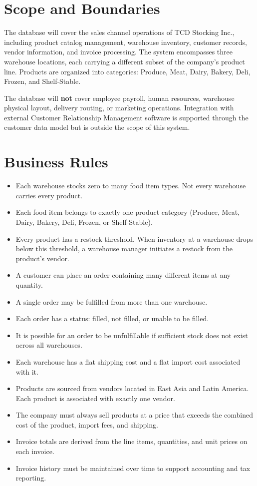 \section{Scope and Boundaries}

The database will cover the sales channel operations of TCD Stocking Inc., including product
catalog management, warehouse inventory, customer records, vendor information, and invoice
processing. The system encompasses three warehouse locations, each carrying a different subset of
the company's product line. Products are organized into categories: Produce, Meat, Dairy, Bakery,
Deli, Frozen, and Shelf-Stable.

The database will \textbf{not} cover employee payroll, human resources, warehouse physical
layout, delivery routing, or marketing operations. Integration with external Customer Relationship
Management software is supported through the customer data model but is outside the scope of
this system.

\section{Business Rules}

\begin{itemize}
  \item Each warehouse stocks zero to many food item types. Not every warehouse carries every product.
  \item Each food item belongs to exactly one product category (Produce, Meat, Dairy, Bakery, Deli,
    Frozen, or Shelf-Stable).
  \item Every product has a restock threshold. When inventory at a warehouse drops below this
    threshold, a warehouse manager initiates a restock from the product's vendor.
  \item A customer can place an order containing many different items at any quantity.
  \item A single order may be fulfilled from more than one warehouse.
  \item Each order has a status: filled, not filled, or unable to be filled.
  \item It is possible for an order to be unfulfillable if sufficient stock does not exist across
    all warehouses.
  \item Each warehouse has a flat shipping cost and a flat import cost associated with it.
  \item Products are sourced from vendors located in East Asia and Latin America. Each product is
    associated with exactly one vendor.
  \item The company must always sell products at a price that exceeds the combined cost of the
    product, import fees, and shipping.
  \item Invoice totals are derived from the line items, quantities, and unit prices on each invoice.
  \item Invoice history must be maintained over time to support accounting and tax reporting.
\end{itemize}
